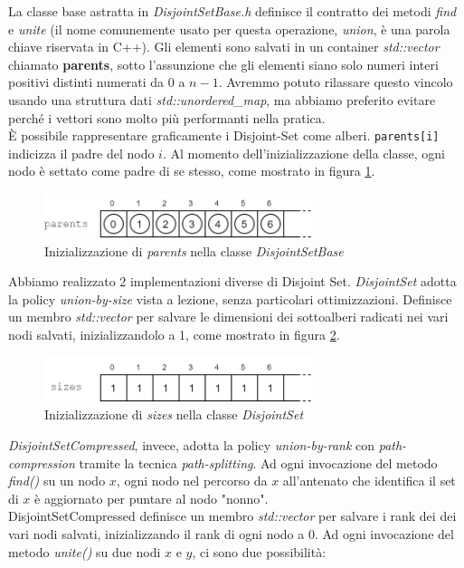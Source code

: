 La classe base astratta in \textit{DisjointSetBase.h} definisce il contratto dei metodi \textit{find} e \textit{unite} (il nome comunemente usato per questa operazione, \textit{union}, è una parola chiave riservata in C++).
Gli elementi sono salvati in un container \textit{std::vector} chiamato \textbf{parents}, sotto l'assunzione che gli elementi siano solo numeri interi positivi distinti numerati da $0$ a $n-1$.
Avremmo potuto rilassare questo vincolo usando una struttura dati \textit{std::unordered\_map}, ma abbiamo preferito evitare perché i vettori sono molto più performanti nella pratica. \\

È possibile rappresentare graficamente i Disjoint-Set come alberi.
\texttt{parents[i]} indicizza il padre del nodo $i$. Al momento dell'inizializzazione della classe, ogni nodo è settato come padre di se stesso, come mostrato in figura \ref{fig:disjoint-set-base-parents}.

\begin{figure}[htbp]
	\centering
	\includegraphics[width=0.7\textwidth]{./images/DisjointSetParentsVector.png}
	\caption{Inizializzazione di \textit{parents} nella classe \textit{DisjointSetBase}}
	\label{fig:disjoint-set-base-parents}
\end{figure}

\noindent Abbiamo realizzato 2 implementazioni diverse di Disjoint Set.
\textit{DisjointSet} adotta la policy \textit{union-by-size} vista a lezione, senza particolari ottimizzazioni. Definisce un membro \textit{std::vector} per salvare le dimensioni dei sottoalberi radicati nei vari nodi salvati, inizializzandolo a 1, come mostrato in figura \ref{fig:disjoint-set-sizes}.

\begin{figure}[htbp]
	\centering
    \includegraphics[width=0.7\textwidth]{./images/DisjointSetSizesVector.png}
	\caption{Inizializzazione di \textit{sizes} nella classe \textit{DisjointSet}}
	\label{fig:disjoint-set-sizes}
\end{figure}

\noindent \textit{DisjointSetCompressed}, invece, adotta la policy \textit{union-by-rank} con \textit{path-compression} tramite la tecnica \textit{path-splitting}.
Ad ogni invocazione del metodo \textit{find()} su un nodo $x$, ogni nodo nel percorso da $x$ all'antenato che identifica il set di $x$ è aggiornato per puntare al nodo "nonno". \\
\noindent DisjointSetCompressed definisce un membro \textit{std::vector} per salvare i rank dei dei vari nodi salvati, inizializzando il rank di ogni nodo a 0. Ad ogni invocazione del metodo \textit{unite()} su due nodi $x$ e $y$, ci sono due possibilità:


